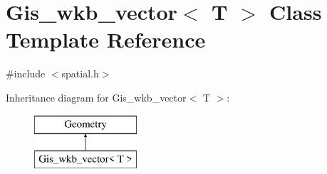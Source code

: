 \hypertarget{classGis__wkb__vector}{}\section{Gis\+\_\+wkb\+\_\+vector$<$ T $>$ Class Template Reference}
\label{classGis__wkb__vector}


{\ttfamily \#include $<$spatial.\+h$>$}

Inheritance diagram for Gis\+\_\+wkb\+\_\+vector$<$ T $>$\+:\begin{figure}[H]
\begin{center}
\leavevmode
\includegraphics[height=2.000000cm]{classGis__wkb__vector}
\end{center}
\end{figure}
